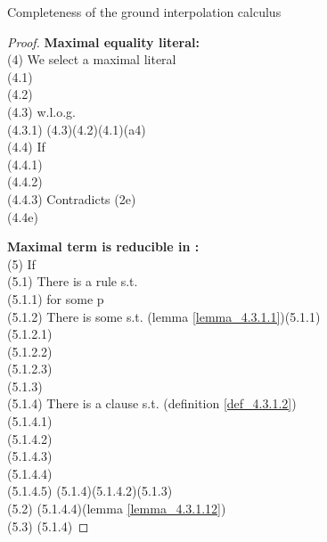 \begin{theorem}{Completeness of the ground interpolation calculus}
\begin{proof}
	\bigskip
	
	\noindent
	\textbf{Maximal equality literal:}\\
	(4) We select a maximal literal \\
	\indent (4.1) \\
	\indent (4.2) \\
	\indent (4.3) w.l.o.g. \\
	\indent \indent (4.3.1)  (4.3)(4.2)(4.1)(a4)\\
	\indent (4.4) If \\
	\indent \indent (4.4.1) \\
	\indent \indent (4.4.2) \\
	\indent \indent (4.4.3) Contradicts (2e)\\
	\indent (4.4e) 

	\bigskip

	
	\noindent
	\textbf{Maximal term is reducible in :}\\
	(5) If \\
	\indent (5.1) There is a rule  s.t.\\
	\indent \indent (5.1.1)  for some p\\
	\indent \indent (5.1.2) There is some \m{\textcolor{blue}{B}} s.t. (lemma \ref{lemma_4.3.1.1})(5.1.1)\\
	\indent \indent \indent (5.1.2.1) \\
	\indent \indent \indent (5.1.2.2) \\
	\indent \indent \indent (5.1.2.3) \\
	\indent \indent (5.1.3)  \\
	\indent \indent (5.1.4) There is a clause  s.t. (definition \ref{def_4.3.1.2})\\
	\indent \indent \indent (5.1.4.1) \\
	\indent \indent \indent (5.1.4.2) \\
	\indent \indent \indent (5.1.4.3) \\
	\indent \indent \indent (5.1.4.4) \\
	\indent \indent \indent (5.1.4.5)  (5.1.4)(5.1.4.2)(5.1.3)\\
	\indent (5.2)  (5.1.4.4)(lemma \ref{lemma_4.3.1.12})\\
	\indent (5.3)  (5.1.4)


\end{proof}
\end{theorem}
